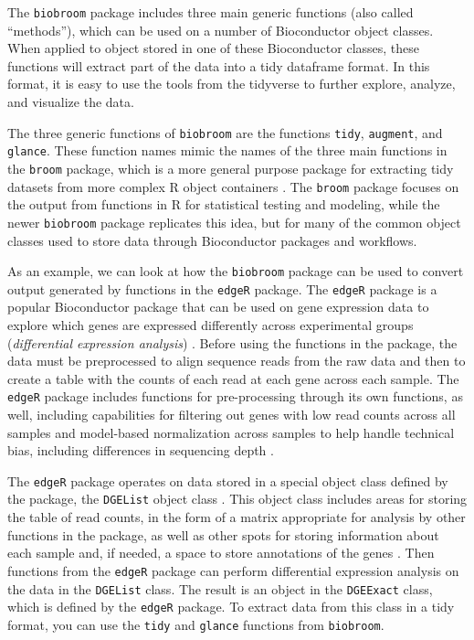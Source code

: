 \documentclass[]{tufte-book}
\begin{document}
The \texttt{biobroom} package includes three main generic functions (also called
``methods''), which can be used on a number of Bioconductor object classes. When
applied to object stored in one of these Bioconductor classes, these functions
will extract part of the data into a tidy dataframe format. In this format, it
is easy to use the tools from the tidyverse to further explore, analyze, and
visualize the data.

The three generic functions of \texttt{biobroom} are the functions \texttt{tidy}, \texttt{augment},
and \texttt{glance}. These function names mimic the names of the three main functions
in the \texttt{broom} package, which is a more general purpose package for extracting
tidy datasets from more complex R object containers \citep{robinson2014broom}. The
\texttt{broom} package focuses on the output from functions in R for statistical
testing and modeling, while the newer \texttt{biobroom} package replicates this idea,
but for many of the common object classes used to store data through
Bioconductor packages and workflows.

As an example, we can look at how the \texttt{biobroom} package can be used to convert
output generated by functions in the \texttt{edgeR} package. The \texttt{edgeR} package is a
popular Bioconductor package that can be used on gene expression data to explore
which genes are expressed differently across experimental groups (\emph{differential
expression analysis}) \citep{edgeR}. Before using the functions in the package, the
data must be preprocessed to align sequence reads from the raw data and then to
create a table with the counts of each read at each gene across each sample. The
\texttt{edgeR} package includes functions for pre-processing through its own functions,
as well, including capabilities for filtering out genes with low read counts
across all samples and model-based normalization across samples to help handle
technical bias, including differences in sequencing depth \citep{chen2014edger}.

The \texttt{edgeR} package operates on data stored in a special object class defined by
the package, the \texttt{DGEList} object class \citep{chen2014edger}. This object class
includes areas for storing the table of read counts, in the form of a matrix
appropriate for analysis by other functions in the package, as well as other
spots for storing information about each sample and, if needed, a space to store
annotations of the genes \citep{chen2014edger}. Then functions from the \texttt{edgeR}
package can perform differential expression analysis on the data in the
\texttt{DGEList} class. The result is an object in the \texttt{DGEExact} class, which is
defined by the \texttt{edgeR} package. To extract data from this class in a tidy
format, you can use the \texttt{tidy} and \texttt{glance} functions from \texttt{biobroom}.
\end{document}
